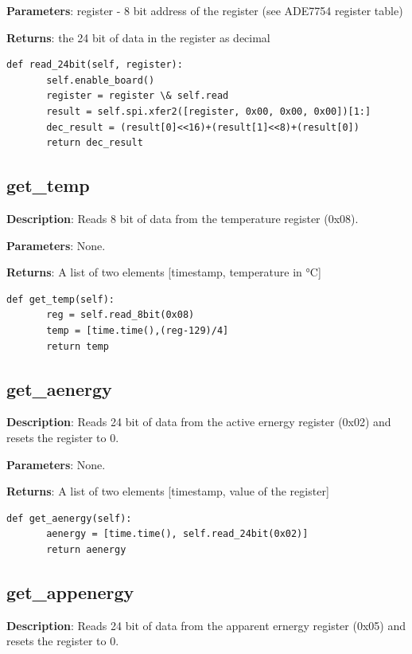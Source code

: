 \documentclass{scrartcl}  %
\begin{document}
\textbf{Parameters}: register - 8 bit address of the register (see ADE7754 register table)

\textbf{Returns}: the 24 bit of data in the register as decimal

\begin{lstlisting}
def read_24bit(self, register):
       self.enable_board()
       register = register \& self.read
       result = self.spi.xfer2([register, 0x00, 0x00, 0x00])[1:]
       dec_result = (result[0]<<16)+(result[1]<<8)+(result[0])
       return dec_result
\end{lstlisting}

\subsection{get_temp}

\textbf{Description}: Reads 8 bit of data from the temperature register (0x08).

\textbf{Parameters}: None.

\textbf{Returns}: A list of two elements [timestamp, temperature in °C]

\begin{lstlisting}
def get_temp(self):
       reg = self.read_8bit(0x08)
       temp = [time.time(),(reg-129)/4]
       return temp
\end{lstlisting}
    
\subsection{get_aenergy}

\textbf{Description}: Reads 24 bit of data from the active ernergy register (0x02) and resets the register to 0.

\textbf{Parameters}: None.

\textbf{Returns}: A list of two elements [timestamp, value of the register]

\begin{lstlisting}
def get_aenergy(self):
       aenergy = [time.time(), self.read_24bit(0x02)]
       return aenergy
\end{lstlisting}

\subsection{get_appenergy}	

\textbf{Description}: Reads 24 bit of data from the apparent ernergy register (0x05) and resets the register to 0.
\end{document}
